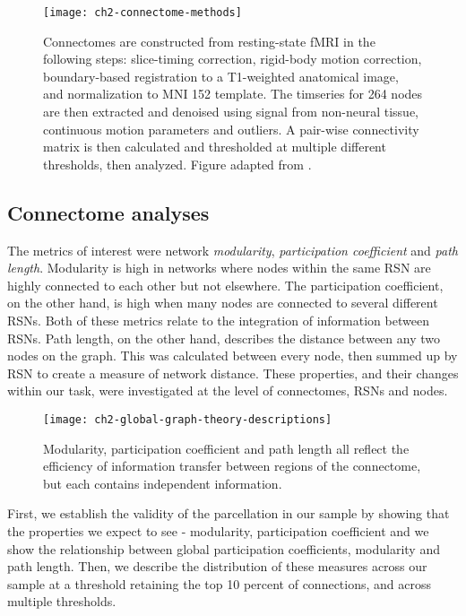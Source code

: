 \begin{figure}[t]
    \centering
    \texttt{[image: ch2-connectome-methods]}
    \caption[Schematic for connectome construction.]{Connectomes are constructed from resting-state fMRI in the following steps: slice-timing correction, rigid-body motion correction, boundary-based registration to a T1-weighted anatomical image, and normalization to MNI 152 template. The timseries for 264 nodes are then extracted and denoised using signal from non-neural tissue, continuous motion parameters and outliers. A pair-wise connectivity matrix is then calculated and thresholded at multiple different thresholds, then analyzed. Figure adapted from \citep{Yang2018}.}
    \label{fig:ch2-connectome-methods}
\end{figure}

\subsection{Connectome analyses}

The metrics of interest were network \textit{modularity}, \textit{participation coefficient} and \textit{path length}. Modularity is high in networks where nodes within the same RSN are highly connected to each other but not elsewhere. The participation coefficient, on the other hand, is high when many nodes are connected to several different RSNs. Both of these metrics relate to the integration of information between RSNs. Path length, on the other hand, describes the distance between any two nodes on the graph. This was calculated between every node, then summed up by RSN to create a measure of network distance. These properties, and their changes within our task, were investigated at the level of connectomes, RSNs and nodes. 

\begin{figure}[t]
    \centering
    \texttt{[image: ch2-global-graph-theory-descriptions]}
    \caption[Distribution and correlations between global graph theory measures.]{Modularity, participation coefficient and path length all reflect the efficiency of information transfer between regions of the connectome, but each contains independent information.}
    \label{fig:ch2-global-graph-theory-descriptions}
\end{figure}

First, we establish the validity of the parcellation in our sample by showing that the properties we expect to see - modularity, participation coefficient and we show the relationship between global participation coefficients, modularity and path length. Then, we describe the distribution of these measures across our sample at a threshold retaining the top 10 percent of connections, and across multiple thresholds. 

